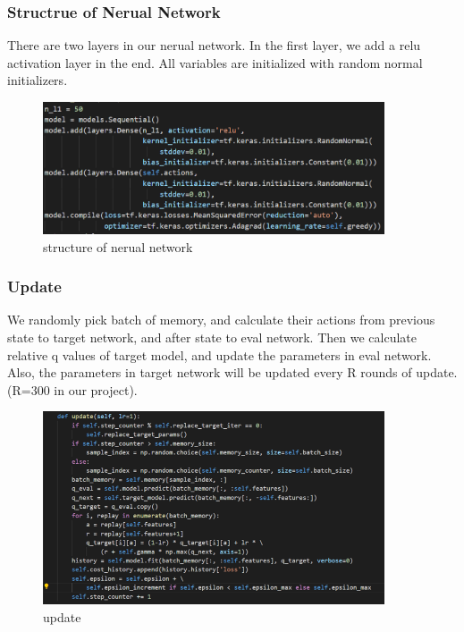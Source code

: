\documentclass[12pt]{article}
\begin{document}
\subsubsection{Structrue of Nerual Network}
There are two layers in our nerual network. In the first layer, we add a relu activation layer in the end. All variables are initialized with random normal initializers.
\begin{figure}[H]
	\begin{center}
		\includegraphics[width=0.9\textwidth]{network}
		\caption{structure of nerual network}
	\end{center}
\end{figure}

\subsubsection{Update}
We randomly pick batch of memory, and calculate their actions from previous state to target network, and after state to eval network. Then we calculate relative q values of target model, and update the parameters in eval network. Also, the parameters in target network will be updated every R rounds of update.(R=300 in our project).
\begin{figure}[H]
	\begin{center}
		\includegraphics[width=0.9\textwidth]{update}
		\caption{update}
	\end{center}
\end{figure}
\end{document}
